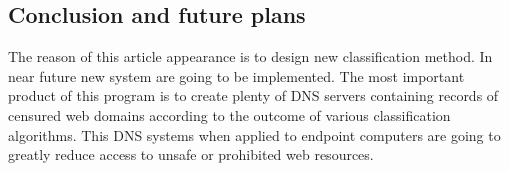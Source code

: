 \documentclass[9pt,a4paper]{extarticle}
\begin{document}
\begin{multicols}{2}
\section{Conclusion and future plans}
The reason of this article appearance is to design new classification method. In near future new system are going to be implemented. The most important product of this program is to create plenty of DNS servers containing records of censured web domains according to the outcome of various classification algorithms. This DNS systems when applied to endpoint computers are going to greatly reduce access to unsafe or prohibited web resources.






\end{multicols}
\end{document}
